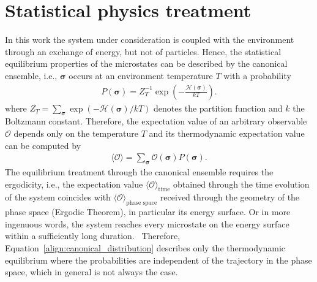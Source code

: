 

\section{Statistical physics treatment}
\label{sec:statistical_physics}

In this work the system under consideration is coupled with the environment through an exchange of energy, but not of particles.
Hence, the statistical equilibrium properties of the microstates can be described by the canonical ensemble, i.e., $\bm{\sigma}$ occurs at 
an environment temperature $T$ with a probability 
\begin{align} 
    P(\bm{\sigma})=Z_T^{-1}\exp\left(-\frac{\mathcal{H}(\bm{\sigma})}{kT}\right).
    \label{align:canonical_distribution}
\end{align}
where $Z_T\!\!=\!\!\sum_{\bm{\sigma}}\exp(-\mathcal{H}(\bm{\sigma})/kT)$ denotes the partition function and $k$ the Boltzmann constant. Therefore, 
the expectation value of an arbitrary observable $\mathcal{O}$ depends only on the temperature $T$ and its thermodynamic expectation value
can be computed by
\begin{align*}
    \langle \mathcal{O} \rangle = \sum_{\bm{\sigma}}\mathcal{O}(\bm{\sigma})P(\bm{\sigma}).
\end{align*}
The equilibrium treatment through the canonical ensemble requires the ergodicity, i.e., the expectation value $\langle \mathcal{O} \rangle_\text{time}$ 
obtained through the time evolution of the system coincides with $\langle \mathcal{O} \rangle_\text{phase space}$ received through the geometry of the 
phase space (Ergodic Theorem), in particular its energy surface. Or in more ingenuous words, the system reaches every microstate on the energy 
surface within a sufficiently long duration.~\cite{Landau1976,Schwabl2000} Therefore, Equation~\eqref{align:canonical_distribution} describes
only the thermodynamic equilibrium where the probabilities are independent of the trajectory in the phase space, which in general is not always the case.

